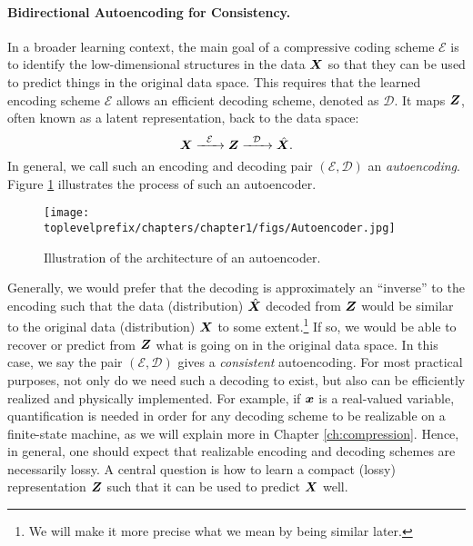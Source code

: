 \documentclass[../../book-main.tex]{subfiles}
\begin{document}
\paragraph{Bidirectional Autoencoding for Consistency.}
In a broader learning context, the main goal of a compressive coding scheme $\mathcal{E}$ is to identify the low-dimensional structures in the data $\bm{X}$ so that they can be used to predict things in the original data space. This requires that the learned encoding scheme $\mathcal{E}$ allows an efficient decoding scheme, denoted as $\mathcal D$. It maps $\bm{Z}$, often known as a latent representation, back to the data space:
\begin{equation}
    \bm{X}   \xrightarrow{\hspace{2mm} \mathcal{E}\hspace{2mm}} \bm{Z}  \xrightarrow{\hspace{2mm} \mathcal{D} \hspace{2mm}} \hat {\bm{X}}.
       \label{eqn:auto-encoding}
\end{equation}
In general, we call such an encoding and decoding pair $(\mathcal{E}, \mathcal{D})$  an {\em autoencoding}. Figure \ref{fig:autoencoder}
illustrates the process of such an autoencoder. 
\begin{figure}
    \centering
    \texttt{[image: \\toplevelprefix/chapters/chapter1/figs/Autoencoder.jpg]}
    \caption{Illustration of the architecture of an autoencoder. }
    \label{fig:autoencoder}
\end{figure}


Generally, we would prefer that the decoding is approximately an ``inverse'' to the encoding such that the data (distribution) $\hat {\bm{X}}$ decoded from $\bm{Z}$ would be similar to the original data (distribution) $\bm{X}$ to some extent.\footnote{We will make it more precise what we mean by being similar later.} If so, we would be able to recover or predict from $\bm{Z}$ what is going on in the original data space. In this case, we say the pair $(\mathcal{E}, \mathcal{D})$ gives a {\em consistent}  autoencoding. For most practical purposes, not only do we need such a decoding to exist, but also can be efficiently realized and physically implemented. For example, if $\bm{x}$ is a real-valued variable, quantification is needed in order for any decoding scheme to be realizable on a finite-state machine, as we will explain more in Chapter \ref{ch:compression}. Hence, in general, one should expect that realizable encoding and decoding schemes are necessarily lossy. A central question is how to learn a compact (lossy) representation $\bm{Z}$ such that it can be used to predict $\bm{X}$ well.
\end{document}
